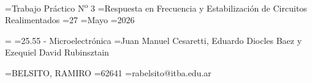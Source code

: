 \def\declvar#1#2{%
   \ifx#1\undefined{}
       \newtoks#1%
   \fi
   #1={#2}}%

\declvar\titulo{Trabajo Práctico N\textsuperscript{o} 3}
\declvar\nombreTP{Respuesta en Frecuencia y Estabilización de Circuitos Realimentados}
\declvar\dia{27}
\declvar\mes{Mayo}
\declvar\ano{2026}

\declvar\grupo{}
\declvar\materia{25.55 - Microelectrónica}
\declvar\profesores{Juan Manuel Cesaretti, Eduardo Diocles Baez y Ezequiel David Rubinsztain}

\declvar\nomEstudianteA{BELSITO, RAMIRO}
\declvar\legajoEstudianteA{62641}
\declvar\mailEstudianteA{rabelsito@itba.edu.ar}